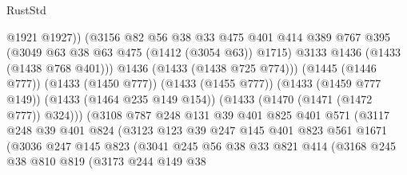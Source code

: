 \begin{lexlean}{RustStd}
\begin{coremodule}
                                @1921
                                @1927))
                            (@3156
                              @82
                              @56
                              @38
                              @33
                              @475
                              @401
                              @414
                              @389
                              @767
                              @395
                              (@3049 @63 @38 @63 @475 (@1412 (@3054 @63)) @1715)
                              @3133
                              @1436
                              (@1433 (@1438 @768 @401)))
                            @1436
                            (@1433 (@1438 @725 @774)))
                          (@1445 (@1446 @777))
                          (@1433 (@1450 @777))
                          (@1433 (@1455 @777))
                          (@1433 (@1459 @777 @149))
                          (@1433 (@1464 @235 @149 @154))
                          (@1433 (@1470 (@1471 (@1472 @777)) @324)))
                        (@3108
                          @787
                          @248
                          @131
                          @39
                          @401
                          @825
                          @401
                          @571
                          (@3117
                            @248
                            @39
                            @401
                            @824
                            (@3123
                              @123
                              @39
                              @247
                              @145
                              @401
                              @823
                              @561
                              @1671
                              (@3036
                                @247
                                @145
                                @823
                                (@3041
                                  @245
                                  @56
                                  @38
                                  @33
                                  @821
                                  @414
                                  (@3168
                                    @245
                                    @38
                                    @810
                                    @819
                                    (@3173
                                      @244
                                      @149
                                      @38

\end{coremodule}
\end{lexlean}
